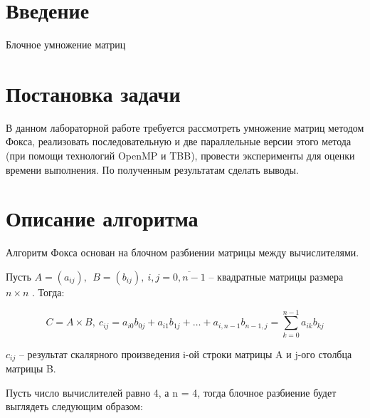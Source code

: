 \documentclass{report}
\begin{document}
\setcounter{page}{2}

\tableofcontents
\newpage

\section*{Введение}
\par Блочное умножение матриц
\newpage

\section*{Постановка задачи}
\par В данном лабораторной работе требуется рассмотреть умножение матриц методом Фокса, реализовать последовательную
 и две параллельные версии этого метода (при помощи технологий OpenMP и TBB), провести эксперименты для оценки времени выполнения. 
 По полученным результатам сделать выводы.
\newpage

\section*{Описание алгоритма}
Алгоритм Фокса основан на блочном разбиении матрицы между вычислителями.\par

Пусть  \( A= \left( a_{ij} \right) ,~~ B= \left( b_{ij} \right) ,~ i,j=\overline{0, n-1} \)  – квадратные матрицы размера  \( n \times n \) . Тогда:\par

 \[ C=A \times B,~ c_{ij}=a_{i0}b_{0j}+a_{i1}b_{1j}+ \ldots +a_{i,n-1}b_{n-1,j}= \sum _{k=0}^{n-1}a_{ik}b_{kj} \] \par

 \( c_{ij} \)  – результат скалярного произведения i-ой строки матрицы A и j-ого столбца матрицы B.\par

 Пусть число вычислителей равно 4, а n = 4, тогда блочное разбиение будет выглядеть следующим образом:\par
\end{document}
